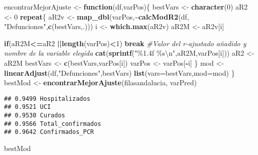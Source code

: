 \documentclass[
]{book}
\newenvironment{Shaded}{\begin{snugshade}}{\end{snugshade}}
\newcommand{\CharTok}[1]{\textcolor[rgb]{0.31,0.60,0.02}{#1}}
\newcommand{\CommentTok}[1]{\textcolor[rgb]{0.56,0.35,0.01}{\textit{#1}}}
\newcommand{\ControlFlowTok}[1]{\textcolor[rgb]{0.13,0.29,0.53}{\textbf{#1}}}
\newcommand{\DataTypeTok}[1]{\textcolor[rgb]{0.13,0.29,0.53}{#1}}
\newcommand{\DecValTok}[1]{\textcolor[rgb]{0.00,0.00,0.81}{#1}}
\newcommand{\KeywordTok}[1]{\textcolor[rgb]{0.13,0.29,0.53}{\textbf{#1}}}
\newcommand{\NormalTok}[1]{#1}
\newcommand{\OperatorTok}[1]{\textcolor[rgb]{0.81,0.36,0.00}{\textbf{#1}}}
\newcommand{\StringTok}[1]{\textcolor[rgb]{0.31,0.60,0.02}{#1}}
\begin{document}
\begin{Shaded}
\begin{Highlighting}[]
\NormalTok{encontrarMejorAjuste \textless{}{-}}\StringTok{ }\ControlFlowTok{function}\NormalTok{(df,varPos)\{}
\NormalTok{  bestVars \textless{}{-}}\StringTok{ }\KeywordTok{character}\NormalTok{(}\DecValTok{0}\NormalTok{)}
\NormalTok{  aR2 \textless{}{-}}\StringTok{ }\DecValTok{0}
  \ControlFlowTok{repeat}\NormalTok{\{}
\NormalTok{    aR2v \textless{}{-}}\StringTok{ }\KeywordTok{map\_dbl}\NormalTok{(varPos,}\OperatorTok{\textasciitilde{}}\KeywordTok{calcModR2}\NormalTok{(df, }\StringTok{"Defunciones"}\NormalTok{,}\KeywordTok{c}\NormalTok{(bestVars,.)))}
\NormalTok{    i    \textless{}{-}}\StringTok{ }\KeywordTok{which.max}\NormalTok{(aR2v)}
\NormalTok{    aR2M \textless{}{-}}\StringTok{ }\NormalTok{aR2v[i]}
    
    \ControlFlowTok{if}\NormalTok{(aR2M}\OperatorTok{\textless{}=}\NormalTok{aR2 }\OperatorTok{||}\KeywordTok{length}\NormalTok{(varPos)}\OperatorTok{\textless{}}\DecValTok{1}\NormalTok{) }\ControlFlowTok{break}
    \CommentTok{\#Valor del r{-}ajustado añadido y nombre de la variable elegida}
    \KeywordTok{cat}\NormalTok{(}\KeywordTok{sprintf}\NormalTok{(}\StringTok{"\%1.4f \%s}\CharTok{\textbackslash{}n}\StringTok{"}\NormalTok{,aR2M,varPos[i]))}
\NormalTok{    aR2 \textless{}{-}}\StringTok{ }\NormalTok{aR2M}
\NormalTok{    bestVars \textless{}{-}}\StringTok{ }\KeywordTok{c}\NormalTok{(bestVars,varPos[i])}
\NormalTok{    varPos \textless{}{-}}\StringTok{ }\NormalTok{varPos[}\OperatorTok{{-}}\NormalTok{i]}
\NormalTok{  \}}
\NormalTok{  mod \textless{}{-}}\StringTok{ }\KeywordTok{linearAdjust}\NormalTok{(df,}\StringTok{"Defunciones"}\NormalTok{,bestVars)}
  \KeywordTok{list}\NormalTok{(}\DataTypeTok{vars=}\NormalTok{bestVars,}\DataTypeTok{mod=}\NormalTok{mod)}
\NormalTok{\}}
\NormalTok{bestMod \textless{}{-}}\StringTok{ }\KeywordTok{encontrarMejorAjuste}\NormalTok{(filasandalucia, varPred)}
\end{Highlighting}
\end{Shaded}

\begin{verbatim}
## 0.9499 Hospitalizados
## 0.9521 UCI
## 0.9530 Curados
## 0.9566 Total_confirmados
## 0.9642 Confirmados_PCR
\end{verbatim}

\begin{Shaded}
\begin{Highlighting}[]
\NormalTok{bestMod}
\end{Highlighting}
\end{Shaded}
\end{document}
